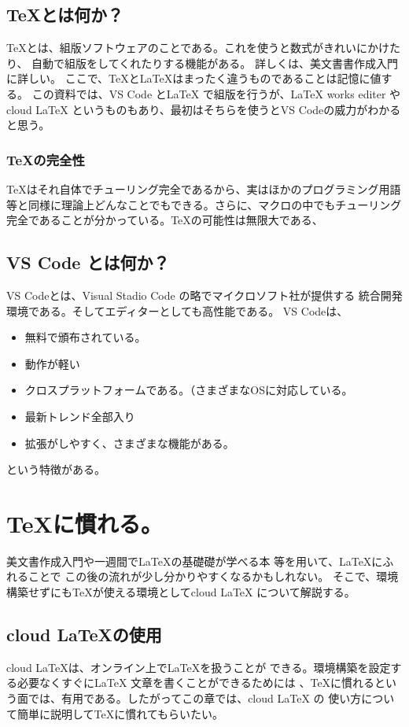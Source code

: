 \documentclass{ltjsarticle}
\begin{document}
\subsection{\TeX とは何か？}
\TeX とは、組版ソフトウェアのことである。これを使うと数式がきれいにかけたり、
自動で組版をしてくれたりする機能がある。
詳しくは、美文書書作成入門\cite{美文書本}に詳しい。
ここで、\TeX と\LaTeX はまったく違うものであることは記憶に値する。
この資料では、VS Code とLaTeX で組版を行うが、LaTeX works editer やcloud LaTeX 
というものもあり、最初はそちらを使うとVS Codeの威力がわかると思う。
\subsubsection*{\TeX の完全性}
\TeX はそれ自体でチューリング完全であるから、実はほかのプログラミング用語等と同様に理論上どんなことでもできる。さらに、マクロの中でもチューリング完全であることが分かっている。\TeX の可能性は無限大である、
\subsection{VS Code とは何か？}
VS Codeとは、Visual Stadio Code の略でマイクロソフト社が提供する
統合開発環境である。そしてエディターとしても高性能である。
VS Codeは、
\begin{itemize}
  \item 無料で頒布されている。
  \item 動作が軽い
  \item クロスプラットフォームである。（さまざまなOSに対応している。
  \item 最新トレンド全部入り
  \item 拡張がしやすく、さまざまな機能がある。
\end{itemize}
という特徴がある。
\section{\TeX に慣れる。}
美文書作成入門\cite{美文書本}や一週間で\LaTeX の基礎礎が学べる本
\cite{一週間基礎}等を用いて、\LaTeX にふれることで
この後の流れが少し分かりやすくなるかもしれない。
そこで、環境構築せずにも\TeX が使える環境としてcloud \LaTeX 
について解説する。
\subsection{cloud \LaTeX の使用}
cloud \LaTeX は、オンライン上で\LaTeX を扱うことが
できる。環境構築を設定する必要なくすぐにLaTeX 文章を書くことができるためには
、TeXに慣れるという面では、有用である。したがってこの章では、cloud LaTeX の
使い方について簡単に説明して\TeX に慣れてもらいたい。
\end{document}
